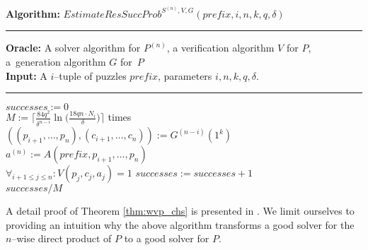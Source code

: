 %
\begin{codeblock}
  \textbf{Algorithm:} $\mathit{EstimateResSuccProb}^{S^{(n)},V, G}(\mathit{prefix}, i, n, k, q, \delta)$
  \medskip \hrule
  \textbf{Oracle:} A solver algorithm for $P^{(n)}$, a verification algorithm $V$ for $P$, a~generation algorithm $G$ for~$P$\\
  \textbf{Input:} A $i$--tuple of puzzles $\mathit{prefix}$, parameters $i, n, k, q, \delta$.
  \medskip\hrule
  $successes := 0$ \\
  \Repeat $M := \Big\lceil \frac{84q^2}{\delta^{n-i}} \ln \Big(\frac{18qn \cdot N_i}{\delta} \Big) \Big\rceil$ times \\
  \IndI $((p_{i+1}, \dotsc, p_n), (c_{i+1}, \dotsc, c_n)) := G^{(n-i)}(1^k)$\\
  \IndI $a^{(n)} := A(\mathit{prefix}, p_{i+1}, \dotsc, p_{n})$\\
  \IndI \If $\forall_{i + 1\leq j \leq n} : V(p_j, c_j, a_j) = 1$ \Then $\mathit{successes := successes + 1}$ \\
  \Return $successes / M$
\end{codeblock}
%
A detail proof of Theorem \ref{thm:wvp_chs} is presented in \cite{canetti2004hardness}.
We limit ourselves to providing an intuition why the above algorithm transforms a good solver
for the $n$--wise direct product of $P$ to a good solver for $P$.

